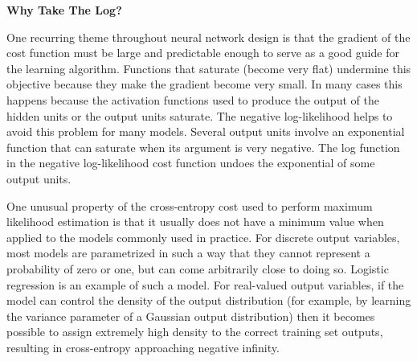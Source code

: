 \begin{framed}
\begin{remark}{\textbf{Why Take The Log?}}

One recurring theme throughout neural network design is that the gradient of
the cost function must be large and predictable enough to serve as a good guide
for the learning algorithm. Functions that saturate (become very ﬂat) undermine
this objective because they make the gradient become very small. In many cases
this happens because the activation functions used to produce the output of the
hidden units or the output units saturate. The negative log-likelihood helps to
avoid this problem for many models. Several output units involve an
exponential function
that can saturate when its argument is very negative. The log
function in the negative log-likelihood cost function undoes the
exponential  of some output units.
\end{remark}
\end{framed}


\begin{framed}
\begin{remark}

One unusual property of the cross-entropy cost used to perform maximum
likelihood estimation is that it usually does not have a minimum value when applied
to the models commonly used in practice. For discrete output variables, most
models are parametrized in such a way that they cannot represent a probability
of zero or one, but can come arbitrarily close to doing so. Logistic regression
is an example of such a model. For real-valued output variables, if the model
can control the density of the output distribution (for example, by learning the
variance parameter of a Gaussian output distribution) then it becomes possible
to assign extremely high density to the correct training set outputs, resulting in
cross-entropy approaching negative inﬁnity.

\end{remark}
\end{framed}
